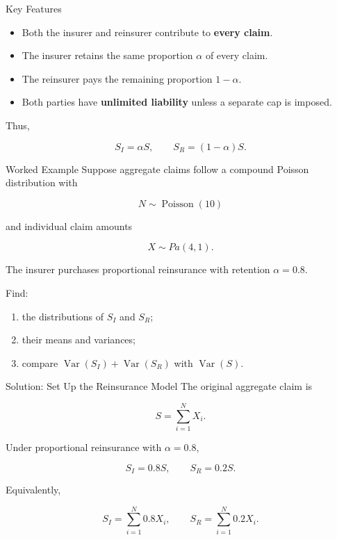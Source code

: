 \documentclass[
  ignorenonframetext,
  aspectratio=169,
]{beamer}
\providecommand{\tightlist}{%
  \setlength{\itemsep}{0pt}\setlength{\parskip}{0pt}}
\begin{document}
\begin{frame}{Key Features}
\protect{}\label{key-features}
\begin{itemize}
\tightlist
\item
  Both the insurer and reinsurer contribute to \textbf{every claim}.
\item
  The insurer retains the same proportion \(\alpha\) of every claim.
\item
  The reinsurer pays the remaining proportion \(1-\alpha\).
\item
  Both parties have \textbf{unlimited liability} unless a separate cap
  is imposed.
\end{itemize}

Thus,

\[
\boxed{S_I=\alpha S,\qquad S_R=(1-\alpha)S}.
\]
\end{frame}

\begin{frame}{Worked Example}
\protect{}\label{worked-example}
Suppose aggregate claims follow a compound Poisson distribution with

\[
N\sim\operatorname{Poisson}(10)
\]

and individual claim amounts

\[
X\sim Pa(4,1).
\]

The insurer purchases proportional reinsurance with retention
\(\alpha=0.8.\)

Find:

\begin{enumerate}
\tightlist
\item
  the distributions of \(S_I\) and \(S_R\);
\item
  their means and variances;
\item
  compare \(\operatorname{Var}(S_I)+\operatorname{Var}(S_R)\) with
  \(\operatorname{Var}(S)\).
\end{enumerate}
\end{frame}

\begin{frame}{Solution: Set Up the Reinsurance Model}
\protect{}\label{solution-set-up-the-reinsurance-model}
The original aggregate claim is

\[
S=\sum_{i=1}^{N}X_i.
\]

Under proportional reinsurance with \(\alpha=0.8\),

\[
S_I=0.8S,
\qquad
S_R=0.2S.
\]

Equivalently,

\[
S_I=\sum_{i=1}^{N}0.8X_i,
\qquad
S_R=\sum_{i=1}^{N}0.2X_i.
\]
\end{frame}
\end{document}
